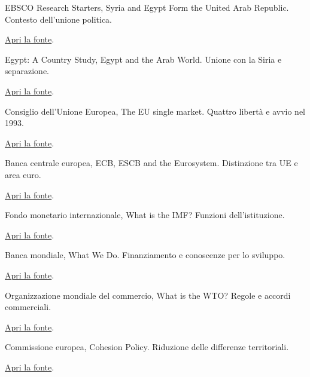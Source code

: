 \begin{enumerate}[label={[\arabic*]},itemsep=8pt]
\item\label{src:raucontesto} EBSCO Research Starters, Syria and Egypt Form the United Arab Republic. Contesto dell’unione politica.\par\href{https://www.ebsco.com/research-starters/politics-and-government/syria-and-egypt-form-united-arab-republic}{\small Apri la fonte}.
\item\label{src:raudifficolta} Egypt: A Country Study, Egypt and the Arab World. Unione con la Siria e separazione.\par\href{https://countrystudies.us/egypt/33.htm}{\small Apri la fonte}.
\item\label{src:ue} Consiglio dell’Unione Europea, The EU single market. Quattro libertà e avvio nel 1993.\par\href{https://www.consilium.europa.eu/en/policies/deeper-single-market/}{\small Apri la fonte}.
\item\label{src:bcearea} Banca centrale europea, ECB, ESCB and the Eurosystem. Distinzione tra UE e area euro.\par\href{https://www.ecb.europa.eu/ecb/orga/escb/html/index.en.html}{\small Apri la fonte}.
\item\label{src:fmi} Fondo monetario internazionale, What is the IMF? Funzioni dell’istituzione.\par\href{https://www.imf.org/en/about/factsheets/imf-at-a-glance}{\small Apri la fonte}.
\item\label{src:bm} Banca mondiale, What We Do. Finanziamento e conoscenze per lo sviluppo.\par\href{https://www.worldbank.org/ext/en/what-we-do}{\small Apri la fonte}.
\item\label{src:omc} Organizzazione mondiale del commercio, What is the WTO? Regole e accordi commerciali.\par\href{https://www.wto.org/english/thewto_e/whatis_e/whatis_e.htm}{\small Apri la fonte}.
\item\label{src:coesione} Commissione europea, Cohesion Policy. Riduzione delle differenze territoriali.\par\href{https://ec.europa.eu/regional_policy/policy/what/investment-policy_en}{\small Apri la fonte}.
\end{enumerate}

